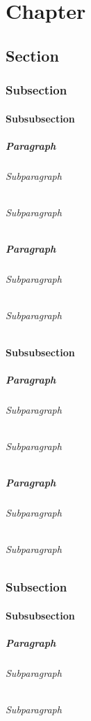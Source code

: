 \chapter{Chapter}
    \section{Section}
        \subsection{Subsection}
            \subsubsection{Subsubsection}
                \paragraph{Paragraph}
                    \subparagraph{Subparagraph}
                    \subparagraph{Subparagraph}
                \paragraph{Paragraph}
                    \subparagraph{Subparagraph}
                    \subparagraph{Subparagraph}
            \subsubsection{Subsubsection}
                \paragraph{Paragraph}
                    \subparagraph{Subparagraph}
                    \subparagraph{Subparagraph}
                \paragraph{Paragraph}
                    \subparagraph{Subparagraph}
                    \subparagraph{Subparagraph}
        \subsection{Subsection}
            \subsubsection{Subsubsection}
                \paragraph{Paragraph}
                    \subparagraph{Subparagraph}
                    \subparagraph{Subparagraph}
